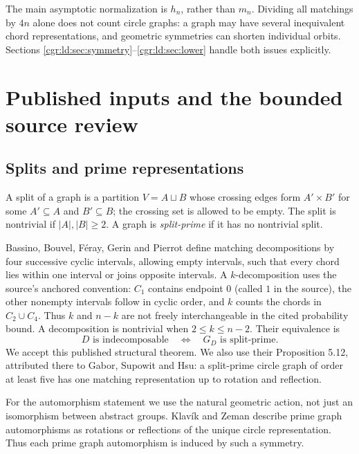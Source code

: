 \documentclass[11pt,letterpaper]{article}
\numberwithin{equation}{section}
\theoremstyle{definition}\newtheorem{definition}[theorem]{Definition}
\theoremstyle{remark}\newtheorem{remark}[theorem]{Remark}
\begin{document}
The main asymptotic normalization is $h_n$, rather than $m_n$.
Dividing all matchings by $4n$ alone does not count circle graphs:
a graph may have several inequivalent chord representations, and
geometric symmetries can shorten individual orbits. Sections
\ref{cgr:ld:sec:symmetry}--\ref{cgr:ld:sec:lower} handle both issues explicitly.

\section{Published inputs and the bounded source review}\label{cgr:ld:sec:inputs}
\subsection{Splits and prime representations}
A split of a graph is a partition $V=A\sqcup B$ whose crossing
edges form $A'\times B'$ for some $A'\subseteq A$ and
$B'\subseteq B$; the crossing set is allowed to be empty. The split
is nontrivial if $|A|,|B|\ge2$. A graph is \emph{split-prime} if it
has no nontrivial split.

Bassino, Bouvel, F\'eray, Gerin and Pierrot
\cite[Definition 5.3 and Proposition 5.5]{BBFGP24} define matching
decompositions by four successive cyclic intervals, allowing empty
intervals, such that every chord lies within one interval or joins
opposite intervals. A $k$-decomposition uses the source's anchored convention: $C_1$
contains endpoint $0$ (called $1$ in the source), the other
nonempty intervals follow in cyclic order, and $k$ counts the
chords in $C_2\cup C_4$. Thus $k$ and $n-k$ are not freely
interchangeable in the cited probability bound. A decomposition is
nontrivial when $2\le k\le n-2$. Their equivalence is
\begin{equation}\label{cgr:ld:eq:prime-equivalence}
 D\text{ is indecomposable}
 \quad\Longleftrightarrow\quad G_D\text{ is split-prime}.
\end{equation}
We accept this published structural theorem. We also use their
Proposition 5.12, attributed there to Gabor, Supowit and Hsu:
a split-prime circle graph of order at least five has one matching
representation up to rotation and reflection.

For the automorphism statement we use the natural geometric action,
not just an isomorphism between abstract groups. Klav\'ik and Zeman
\cite[proof of Lemma 8 and the following geometric explanation,
pp.~548--549]{KZ15} describe prime graph automorphisms as rotations
or reflections of the unique circle representation. Thus each prime
graph automorphism is induced by such a symmetry.
\end{document}
